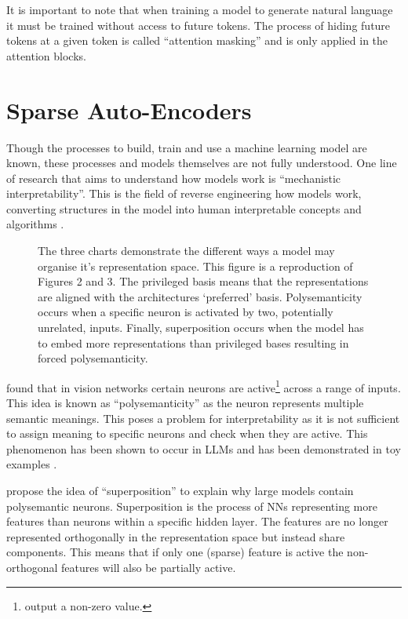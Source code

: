 It is important to note that when training a model to generate natural language it must be trained without access to future tokens.
The process of hiding future tokens at a given token is called ``attention masking'' and is only applied in the attention blocks.

\section{Sparse Auto-Encoders}
\label{sec:sae}

Though the processes to build, train and use a machine learning model are known, these processes and models themselves are not fully understood.
One line of research that aims to understand how models work is ``mechanistic interpretability''.
This is the field of reverse engineering how models work, converting structures in the model into human interpretable concepts and algorithms \citep{mech-interp}.

\begin{figure}
    \centering
    \captionsetup{width=.9\textwidth}
    
    \caption{The three charts demonstrate the different ways a model may organise it's representation space. This figure is a reproduction of \citet{superposition} Figures 2 and 3. The privileged basis means that the representations are aligned with the architectures `preferred' basis. Polysemanticity occurs when a specific neuron is activated by two, potentially unrelated, inputs. Finally, superposition occurs when the model has to embed more representations than privileged bases resulting in forced polysemanticity.}
    \label{fig:superposition}
\end{figure}

\citet{polysemanticity} found that in vision networks certain neurons are active\footnote{output a non-zero value.} across a range of inputs.
This idea is known as ``polysemanticity'' as the neuron represents multiple semantic meanings.
This poses a problem for interpretability as it is not sufficient to assign meaning to specific neurons and check when they are active.
This phenomenon has been shown to occur in LLMs and has been demonstrated in toy examples \citep{superposition}.

\citet{superposition} propose the idea of ``superposition'' to explain why large models contain polysemantic neurons.
Superposition is the process of NNs representing more features than neurons within a specific hidden layer.
The features are no longer represented orthogonally in the representation space but instead share components.
This means that if only one (sparse) feature is active the non-orthogonal features will also be partially active.

